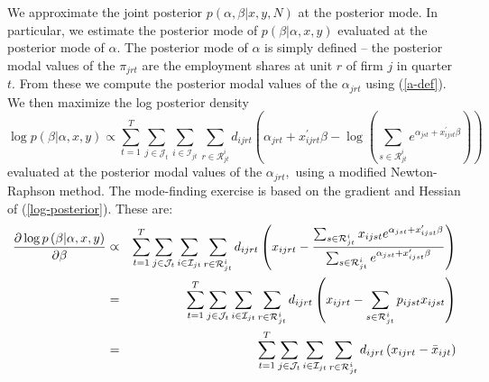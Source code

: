 We approximate the joint posterior $p\left( \alpha ,\beta |x,y,N\right) $ at
the posterior mode. In particular, we estimate the posterior mode of $%
p\left( \beta |\alpha ,x,y\right) $ evaluated at the posterior mode of $%
\alpha .$ The posterior mode of $\alpha $ is simply defined -- the posterior
modal values of the $\pi _{jrt}$ are the employment shares at unit $r$ of
firm $j$ in quarter $t.$ From these we compute the posterior modal values of
the $\alpha _{jrt}$ using (\ref{a-def}). We then maximize the log posterior
density%
\begin{equation}
\log p\left( \beta |\alpha ,x,y\right) \varpropto \sum_{t=1}^{T}\sum_{j\in 
\mathcal{J}_{t}}\sum_{i\in \mathcal{I}_{jt}}\sum_{r\in \mathcal{R}%
_{jt}^{i}}d_{ijrt}\left( \alpha _{jrt}+x_{ijrt}^{\prime }\beta -\log \left(
\sum_{s\in \mathcal{R}_{jt}^{i}}e^{\alpha _{jst}+x_{ijst}^{\prime }\beta
}\right) \right)  \label{log-posterior}
\end{equation}%
evaluated at the posterior modal values of the $\alpha _{jrt},$ using a
modified Newton-Raphson method. The mode-finding exercise is based on the
gradient and Hessian of (\ref{log-posterior}). These are:%
\begin{eqnarray}
\frac{\partial \log p\left( \beta |\alpha ,x,y\right) }{\partial \beta }
&\varpropto &\sum_{t=1}^{T}\sum_{j\in \mathcal{J}_{t}}\sum_{i\in \mathcal{I}%
_{jt}}\sum_{r\in \mathcal{R}_{jt}^{i}}d_{ijrt}\left( x_{ijrt}-\frac{%
\sum_{s\in \mathcal{R}_{jt}^{i}}x_{ijst}e^{\alpha _{jst}+x_{ijst}^{\prime
}\beta }}{\sum_{s\in \mathcal{R}_{jt}^{i}}e^{\alpha _{jst}+x_{ijst}^{\prime
}\beta }}\right)  \notag \\
&=&\sum_{t=1}^{T}\sum_{j\in \mathcal{J}_{t}}\sum_{i\in \mathcal{I}%
_{jt}}\sum_{r\in \mathcal{R}_{jt}^{i}}d_{ijrt}\left( x_{ijrt}-\sum_{s\in 
\mathcal{R}_{jt}^{i}}p_{ijst}x_{ijst}\right)  \notag \\
&=&\sum_{t=1}^{T}\sum_{j\in \mathcal{J}_{t}}\sum_{i\in \mathcal{I}%
_{jt}}\sum_{r\in \mathcal{R}_{jt}^{i}}d_{ijrt}\left( x_{ijrt}-\bar{x}%
_{ijt}\right)  \label{gradient}
\end{eqnarray}%
